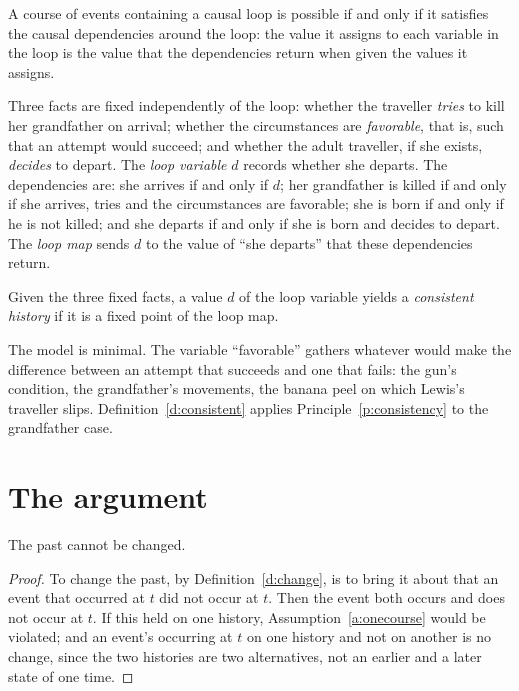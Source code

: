 \documentclass{situationist-preprint}
\begin{document}
\begin{principle}\label{p:consistency}
A course of events containing a causal loop is possible if and only if it satisfies the causal dependencies around the loop: the value it assigns to each variable in the loop is the value that the dependencies return when given the values it assigns.
\end{principle}

\begin{definition}\label{d:model}
Three facts are fixed independently of the loop: whether the traveller \emph{tries} to kill her grandfather on arrival; whether the circumstances are \emph{favorable}, that is, such that an attempt would succeed; and whether the adult traveller, if she exists, \emph{decides} to depart. The \emph{loop variable} $d$ records whether she departs. The dependencies are: she arrives if and only if $d$; her grandfather is killed if and only if she arrives, tries and the circumstances are favorable; she is born if and only if he is not killed; and she departs if and only if she is born and decides to depart. The \emph{loop map} sends $d$ to the value of \enquote{she departs} that these dependencies return.
\end{definition}

\begin{definition}\label{d:consistent}
Given the three fixed facts, a value $d$ of the loop variable yields a \emph{consistent history} if it is a fixed point of the loop map.
\end{definition}

The model is minimal. The variable \enquote{favorable} gathers whatever would make the difference between an attempt that succeeds and one that fails: the gun's condition, the grandfather's movements, the banana peel on which Lewis's traveller slips. Definition~\ref{d:consistent} applies Principle~\ref{p:consistency} to the grandfather case.

\section{The argument}

\begin{lemma}\label{l:nochange}
The past cannot be changed.
\end{lemma}

\begin{proof}
To change the past, by Definition~\ref{d:change}, is to bring it about that an event that occurred at $t$ did not occur at $t$. Then the event both occurs and does not occur at $t$. If this held on one history, Assumption~\ref{a:onecourse} would be violated; and an event's occurring at $t$ on one history and not on another is no change, since the two histories are two alternatives, not an earlier and a later state of one time.
\end{proof}
\end{document}
